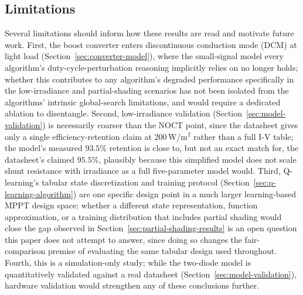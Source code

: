 \subsection{Limitations}
Several limitations should inform how these results are read and motivate
future work. First, the boost converter enters discontinuous conduction
mode (DCM) at light load (Section~\ref{sec:converter-model}), where the
small-signal model every algorithm's duty-cycle-perturbation reasoning
implicitly relies on no longer holds; whether this contributes to any
algorithm's degraded performance specifically in the low-irradiance and
partial-shading scenarios has not been isolated from the algorithms'
intrinsic global-search limitations, and would require a dedicated
ablation to disentangle. Second, low-irradiance validation
(Section~\ref{sec:model-validation}) is necessarily coarser than the NOCT
point, since the datasheet gives only a single efficiency-retention claim
at 200\,W/m$^2$ rather than a full I-V table; the model's measured $93.5\%$
retention is close to, but not an exact match for, the datasheet's claimed
$95.5\%$, plausibly because this simplified model does not scale shunt
resistance with irradiance as a full five-parameter model would. Third,
Q-learning's tabular state discretization and training protocol
(Section~\ref{sec:q-learning-algorithm}) are one specific design point in a
much larger learning-based MPPT design space; whether a different state
representation, function approximation, or a training distribution that
includes partial shading would close the gap observed in
Section~\ref{sec:partial-shading-results} is an open question this paper
does not attempt to answer, since doing so changes the fair-comparison
premise of evaluating the same tabular design used throughout. Fourth, this
is a simulation-only study; while the two-diode model is quantitatively
validated against a real datasheet (Section~\ref{sec:model-validation}),
hardware validation would strengthen any of these conclusions further.

